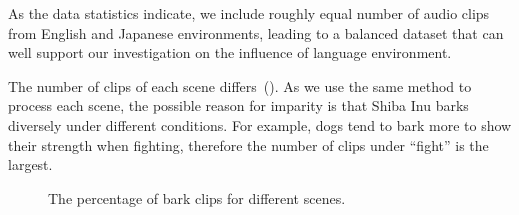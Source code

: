 As the data statistics indicate, we include roughly equal number of audio clips 
from English and Japanese environments, leading to a balanced dataset that can well 
support our investigation on the influence of language environment.

The number of clips of each scene differs~(). 
As we use the same method to process each scene, the possible reason for imparity is that Shiba Inu barks diversely under different conditions. For example, dogs tend to bark more
to show their strength when fighting, therefore the number of clips under ``fight'' is 
the largest.


\begin{figure}[th]
	\centering
	\caption{The percentage of bark clips for different scenes.}
	\label{fig:keyword_rosepie}
\end{figure}
